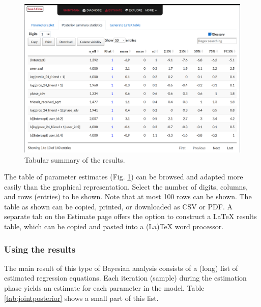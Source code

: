 \documentclass[
  english,
  doc]{apa6}
\begin{document}
\begin{figure}[H]
\includegraphics[width=1\linewidth]{shinystan6} \caption{Tabular summary of the results.}\label{fig:shinystanshot6}
\end{figure}

The table of parameter estimates (Fig. \ref{fig:shinystanshot6}) can be browsed and adapted more easily than the graphical representation. Select the number of digits, columns, and rows (entries) to be shown. Note that at most 100 rows can be shown. The table as shown can be copied, printed, or downloaded as CSV or PDF. A separate tab on the Estimate page offers the option to construct a LaTeX results table, which can be copied and pasted into a (La)TeX word processor.

\hypertarget{using-the-results}{%
\subsubsection{Using the results}\label{using-the-results}}

The main result of this type of Bayesian analysis consists of a (long) list of estimated regression equations. Each iteration (sample) during the estimation phase yields an estimate for each parameter in the model. Table \ref{tab:jointposterior} shows a small part of this list.
\end{document}
